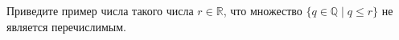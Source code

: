 Приведите пример числа такого числа $r \in \mathbb{R}$, что множество $\{q \in \mathbb{Q} \mid q \le r\}$ не является
перечислимым.